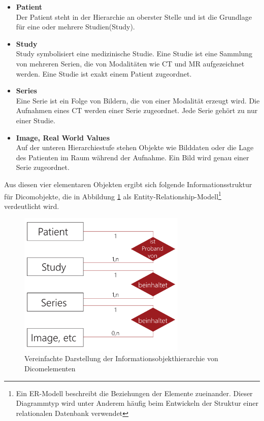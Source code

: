 \begin{itemize}
	\item \textbf{Patient}\\
	Der Patient steht in der Hierarchie an oberster Stelle und ist die Grundlage für eine oder mehrere Studien(Study).
	\item	\textbf{Study}\\
	Study symbolisiert eine medizinische Studie. Eine Studie ist eine Sammlung von mehreren Serien, die von Modalitäten wie CT und MR aufgezeichnet werden. Eine Studie ist exakt einem Patient zugeordnet.
	\item \textbf{Series}\\
	Eine Serie ist ein Folge von Bildern, die von einer Modalität erzeugt wird. Die Aufnahmen eines CT werden einer Serie zugeordnet. Jede Serie gehört zu nur einer Studie.
	\item \textbf{Image, Real World Values}\\
	Auf der unteren Hierarchiestufe stehen Objekte wie Bilddaten oder die Lage des Patienten im Raum während der Aufnahme. Ein Bild wird genau einer Serie zugeordnet.
\end{itemize}

Aus diesen vier elementaren Objekten ergibt sich folgende Informationsstruktur für Dicomobjekte, die in Abbildung \ref{ermodel} als Entity-Relationship-Modell\footnote{Ein ER-Modell beschreibt die Beziehungen der Elemente zueinander. Dieser Diagrammtyp wird unter Anderem häufig beim Entwickeln der Struktur einer relationalen Datenbank verwendet} verdeutlicht wird.

\begin{figure}[htbp]
  \vspace{0.5cm}
  \centering
  \includegraphics[angle=0,width=8cm]{./img/ermodel.pdf}
  \caption{Vereinfachte Darstellung der Informationsobjekthierarchie von Dicomelementen}
  \label{ermodel}
  \vspace{0.5cm}
\end{figure}

